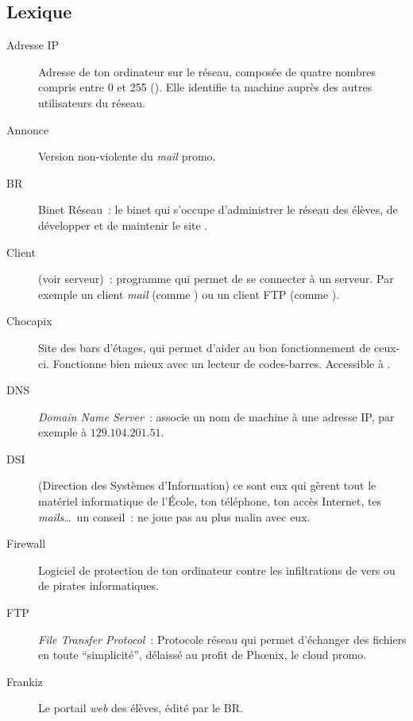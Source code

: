 \subsection{Lexique}


\begin{description}
  \item[Adresse IP] Adresse de ton ordinateur sur le réseau, composée de quatre nombres compris entre 0 et 255  (). Elle identifie ta machine auprès des autres utilisateurs du réseau.

  \item[Annonce] Version non-violente du \emph{mail} promo.

  \item[BR] Binet Réseau~: le binet qui s'occupe d'administrer le réseau des élèves, de développer et de maintenir le site .

  \item[Client] (voir serveur)~: programme qui permet de se connecter à un serveur. Par exemple un client \emph{mail}
	(comme ) ou un client FTP (comme ).

  \item[Chocapix] Site des bars d'étages, qui permet d'aider au bon fonctionnement de ceux-ci. Fonctionne bien mieux avec un lecteur de codes-barres. Accessible à .

  \item[DNS] \emph{Domain Name Server}~: associe un nom de machine à une adresse IP, par exemple  à  $129.104.201.51$.

  \item[DSI] (Direction des Systèmes d'Information) ce sont eux qui gèrent tout le matériel informatique de l'École, ton téléphone, ton accès Internet, tes \emph{mails}\ldots\ un conseil~: ne joue pas au plus malin avec eux.

  \item[Firewall] Logiciel de protection de ton ordinateur contre les infiltrations de vers ou de pirates informatiques.

  \item[FTP] \emph{File Transfer Protocol}~: Protocole réseau qui permet d'échanger des fichiers en toute “simplicité”, délaissé au profit de Phœnix, le cloud promo.

  \item[Frankiz] Le portail \emph{web} des élèves, édité par le BR.


\end{description}
